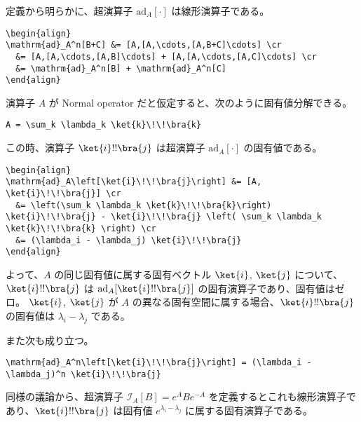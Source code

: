 \documentclass[dvipdfmx]{jsarticle}
\begin{document}
定義から明らかに、超演算子 \(\mathrm{ad}_A[\cdot]\) は線形演算子である。

\begin{verbatim}
\begin{align}
\mathrm{ad}_A^n[B+C] &= [A,[A,\cdots,[A,B+C]\cdots] \cr
  &= [A,[A,\cdots,[A,B]\cdots] + [A,[A,\cdots,[A,C]\cdots] \cr
  &= \mathrm{ad}_A^n[B] + \mathrm{ad}_A^n[C]
\end{align}
\end{verbatim}

演算子 \(A\) が Normal operator
だと仮定すると、次のように固有値分解できる。

\begin{verbatim}
A = \sum_k \lambda_k \ket{k}\!\!\bra{k}
\end{verbatim}

この時、演算子 \(\ket{i}\\!\\!\bra{j}\) は超演算子
\(\mathrm{ad}_A[\cdot]\) の固有値である。

\begin{verbatim}
\begin{align}
\mathrm{ad}_A\left[\ket{i}\!\!\bra{j}\right] &= [A, \ket{i}\!\!\bra{j}] \cr
  &= \left(\sum_k \lambda_k \ket{k}\!\!\bra{k}\right) \ket{i}\!\!\bra{j} - \ket{i}\!\!\bra{j} \left( \sum_k \lambda_k \ket{k}\!\!\bra{k} \right) \cr
  &= (\lambda_i - \lambda_j) \ket{i}\!\!\bra{j}
\end{align}
\end{verbatim}

よって、\(A\) の同じ固有値に属する固有ベクトル \(\ket{i}\), \(\ket{j}\)
について、\(\ket{i}\\!\\!\bra{j}\) は
\(\mathrm{ad}_A[\ket{i}\\!\\!\bra{j}]\)
の固有演算子であり、固有値はゼロ。 \(\ket{i}\), \(\ket{j}\) が \(A\)
の異なる固有空間に属する場合、\(\ket{i}\\!\\!\bra{j}\) の固有値は
\(\lambda_i - \lambda_j\) である。

また次も成り立つ。

\begin{verbatim}
\mathrm{ad}_A^n\left[\ket{i}\!\!\bra{j}\right] = (\lambda_i - \lambda_j)^n \ket{i}\!\!\bra{j}
\end{verbatim}

同様の議論から、超演算子 \(\mathcal{I}_A[B] = e^A B e^{-A}\)
を定義するとこれも線形演算子であり、\(\ket{i}\\!\\!\bra{j}\) は固有値
\(e^{\lambda_i - \lambda_j}\) に属する固有演算子である。
\end{document}
